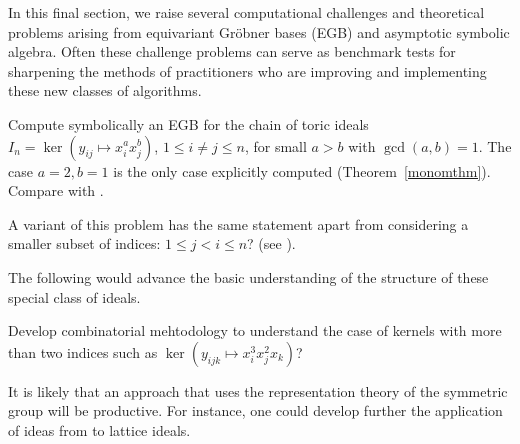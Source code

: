 
In this final section, we raise several computational challenges and theoretical problems arising from equivariant Gr\"obner bases (EGB) and asymptotic symbolic algebra.  Often these challenge problems can serve as benchmark tests for sharpening the methods of practitioners who are improving and implementing these new classes of algorithms.

\begin{problem}
Compute symbolically an EGB for the chain of toric ideals $I_n = \ker(y_{ij} \mapsto x_i^a x_j^b)$, $1 \leq i \neq j \leq n$, for small $a>b$ with $\gcd(a,b)=1$.  The case $a=2,b=1$ is the only case explicitly computed (Theorem~\ref{monomthm}). Compare with \cite{Hillar13, hillar2016corrigendum, KKL:equivariant-markov, draisma2013noetherianity}.  

A variant of this problem has the same statement apart from considering a smaller subset of indices: $1 \leq j < i \leq n$?  (see \cite[Remark 6.3]{draisma2013noetherianity}).
\end{problem}

%

The following would advance the basic understanding of the structure of these special class of ideals.

\begin{problem}
Develop combinatorial mehtodology to understand the case of kernels with more than two indices such as $\ker(y_{ijk} \mapsto x_i^3 x_j^2 x_k)$?  
\end{problem}

It is likely that an approach that uses the representation theory of the symmetric group will be productive.  For instance, one could develop further the application of ideas from \cite{camina1991some} to lattice ideals.



